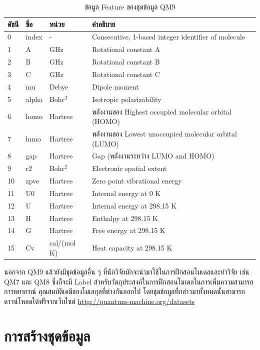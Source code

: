 \begin{table}[H]
    \centering
    \caption{ข้อมูล Feature ของชุดข้อมูล QM9}
    \label{tab:qm9_feature}
    \small
    \begin{tabular}{llll}\toprule
    \textbf{ดัชนี} &\textbf{ชื่อ} &\textbf{หน่วย} &\textbf{คำอธิบาย} \\\midrule
    0 &index &- &Consecutive, 1-based integer identifier of molecule \\
    1 &A &GHz &Rotational constant A \\
    2 &B &GHz &Rotational constant B \\
    3 &C &GHz &Rotational constant C \\
    4 &mu &Debye &Dipole moment \\
    5 &alpha &Bohr$^3$ &Isotropic polarizability \\
    6 &homo &Hartree &พลังงานของ Highest occupied molecular orbital (HOMO) \\
    7 &lumo &Hartree &พลังงานของ Lowest unoccupied molecular orbital (LUMO) \\
    8 &gap &Hartree &Gap (พลังงานระหว่าง LUMO and HOMO) \\
    9 &r2 &Bohr$^2$ &Electronic spatial extent \\
    10 &zpve &Hartree &Zero point vibrational energy \\
    11 &U0 &Hartree &Internal energy at 0 K \\
    12 &U &Hartree &Internal energy at 298.15 K \\
    13 &H &Hartree &Enthalpy at 298.15 K \\
    14 &G &Hartree &Free energy at 298.15 K \\
    15 &Cv &cal/(mol K) &Heat capacity at 298.15 K \\
    \bottomrule
    \end{tabular}
\end{table}

นอกจาก QM9 แล้วยังมีชุดข้อมูลอื่น ๆ ที่นักวิจัยมักจะนำมาใช้ในการฝึกสอนโมเดลและทำวิจัย เช่น QM7\cite{blum2009,rupp2012a} และ 
QM8\cite{ruddigkeit2012,ramakrishnan2015} ซึ่งก็จะมี Label สำหรับวัตถุประสงค์ในการฝึกสอนโมเดลในการเพิ่มความสามารถการพยากรณ์%
คุณสมบัติเคมีของโมเลกุลที่ต่างกันออกไป โดยชุดข้อมูลที่กล่าวมาทั้งหมดนั้นสามารถดาวน์โหลดได้ฟรีจากเว็บไซต์ 
\url{http://quantum-machine.org/datasets}

\section{การสร้างชุดข้อมูล}

